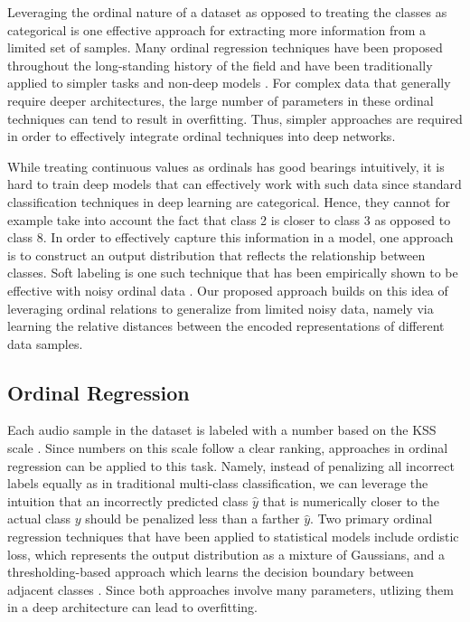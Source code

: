 Leveraging the ordinal nature of a dataset as opposed to treating the classes as categorical is one effective approach for extracting more information from a limited set of samples. %
Many ordinal regression techniques have been proposed throughout the long-standing history of the field
and have been traditionally applied to simpler tasks and non-deep models \cite{chu2005ordinal, rennie2005ordistic}.
For complex data %
that generally require deeper architectures, the large number of parameters in these ordinal techniques %
can tend to result in overfitting. 
Thus, simpler approaches are required in order to effectively integrate ordinal techniques into deep networks.

While treating continuous values as ordinals has good bearings intuitively, it is hard to train deep models that can effectively work with such data since standard classification techniques in deep learning are categorical. Hence, they cannot for example take into account the fact that class 2 is closer to class 3 as opposed to class 8. In order to effectively capture this information in a model, one approach is to construct an output distribution that reflects the relationship between classes. Soft labeling is one such technique that has been empirically shown to be effective with noisy ordinal
data \cite{zhang2019fsim}.
Our proposed approach builds on this idea of leveraging ordinal relations to generalize from limited noisy data, namely via learning the relative distances between the encoded representations of different data samples. 


\subsection{Ordinal Regression}

Each audio sample in the dataset is labeled with a number based on the KSS scale \cite{shahid2012kss}.
Since numbers on this scale follow a clear ranking, approaches in ordinal regression can be applied to this task.
Namely, instead of penalizing all incorrect labels equally as in traditional multi-class classification, we can leverage the intuition that an incorrectly predicted class $\hat{y}$ that is numerically closer to the actual class $y$ should be penalized less than a farther $\hat{y}$.
Two primary ordinal regression techniques that have been applied to statistical models include ordistic loss, which represents the output distribution as a mixture of Gaussians, and a thresholding-based approach which learns the decision boundary between adjacent classes \cite{rennie2005ordistic}. Since both approaches involve many parameters, utlizing them in a deep architecture can lead to overfitting.

